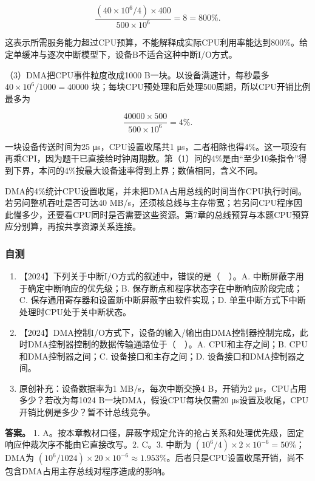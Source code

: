 \[
\frac{(40\times10^6/4)\times400}{500\times10^6}=8=800\%.
\]

这表示所需服务能力超过CPU预算，不能解释成实际CPU利用率能达到800\%。给定单缓冲与逐次中断模型下，设备B不适合这种中断I/O方式。

（3）DMA把CPU事件粒度改成1000 B一块。以设备满速计，每秒最多 \(40\times10^6/1000=40000\) 块；每块CPU预处理和后处理500周期，所以CPU开销比例最多为

\[
\frac{40000\times500}{500\times10^6}=4\%.
\]

一块设备传送时间为25 μs，CPU设置收尾共1 μs，二者相除也得4\%。这一项没有再乘CPI，因为题干已直接给时钟周期数。第（1）问的4\%是由``至少10条指令''得到下界，本问的4\%按最大设备速率得到上界；数值相同，含义不同。

DMA的4\%统计CPU设置收尾，并未把DMA占用总线的时间当作CPU执行时间。若另问整机吞吐是否可达40 MB/s，还须核总线与主存带宽；若另问CPU程序因此慢多少，还要看CPU同时是否需要这些资源。第7章的总线预算与本题CPU预算应分别算，再按共享资源关系连接。

\subsubsection{自测}\label{co-self8}

\begin{enumerate}
\def\labelenumi{\arabic{enumi}.}
\tightlist
\item
  【2024】下列关于中断I/O方式的叙述中，错误的是（　）。A. 中断屏蔽字用于确定中断响应的优先级；B. 保存断点和程序状态字在中断响应阶段完成；C. 保存通用寄存器和设置新中断屏蔽字由软件实现；D. 单重中断方式下中断处理时CPU处于关中断状态。
\item
  【2024】DMA控制I/O方式下，设备的输入/输出由DMA控制器控制完成，此时DMA控制器控制的数据传输通路位于（　）。A. CPU和主存之间；B. CPU和DMA控制器之间；C. 设备接口和主存之间；D. 设备接口和DMA控制器之间。
\item
  原创补充：设备数据率为1 MB/s，每次中断交换4 B，开销为2 μs，CPU占用多少？若改为每1024 B一块DMA，假设CPU每块仅需20 μs设置及收尾，CPU开销比例是多少？暂不计总线竞争。
\end{enumerate}

\textbf{答案。} 1. A。按本章教材口径，屏蔽字规定允许的抢占关系和处理优先级，固定响应仲裁次序不能由它直接改写。2. C。3. 中断为 \((10^6/4)\times2\times10^{-6}=50\%\)；DMA为 \((10^6/1024)\times20\times10^{-6}\approx1.953\%\)。后者只是CPU设置收尾开销，尚不包含DMA占用主存总线对程序造成的影响。
